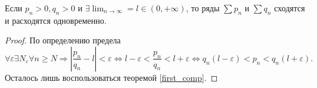 \begin{theorem}
    Если $p_n > 0, q_n > 0$ и $\exists \lim_{n \to \infty} = l \in (0, +\infty)$, то ряды $\sum p_n$ и $\sum q_n$ сходятся и расходятся одновременно.
    \begin{proof}
        По определению предела
        \[
            \forall \varepsilon
            \exists N_{\varepsilon}
            \forall n \geqslant N
            \Rightarrow
            \left|
                \frac{p_n}{q_n} - l
            \right| < \varepsilon
            \Leftrightarrow
            l - \varepsilon < \frac{p_n}{q_n} < l + \varepsilon
            \Leftrightarrow
            q_n(l - \varepsilon) < p_n < q_n(l + \varepsilon).
        \]
        Осталось лишь воспользоваться теоремой \ref{first_comp}.
    \end{proof}
\end{theorem}

